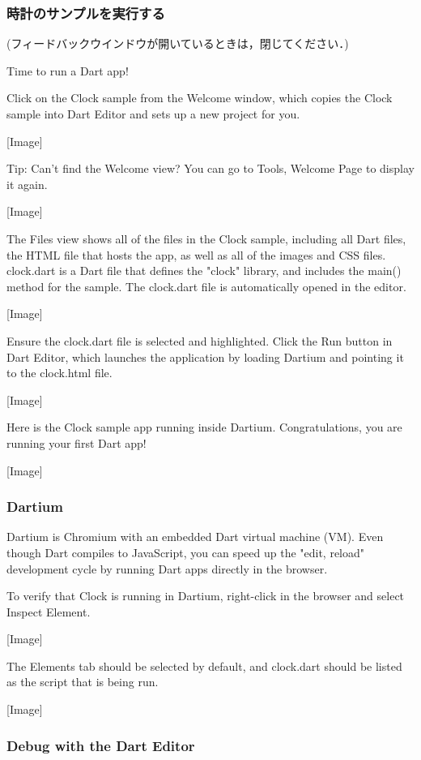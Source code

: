 \subsubsection{時計のサンプルを実行する}

(フィードバックウインドウが開いているときは，閉じてください．)

Time to run a Dart app!

Click on the Clock sample from the Welcome window, which copies the Clock sample into Dart Editor and sets up a new project for you.

[Image]

Tip: Can’t find the Welcome view? You can go to Tools, Welcome Page to display it again.

[Image]

The Files view shows all of the files in the Clock sample, including all Dart files, the HTML file that hosts the app, as well as all of the images and CSS files. clock.dart is a Dart file that defines the "clock" library, and includes the main() method for the sample. The clock.dart file is automatically opened in the editor.

[Image]

Ensure the clock.dart file is selected and highlighted. Click the Run button in Dart Editor, which launches the application by loading Dartium and pointing it to the clock.html file.

[Image]

Here is the Clock sample app running inside Dartium. Congratulations, you are running your first Dart app!

[Image]

\subsubsection{Dartium}

Dartium is Chromium with an embedded Dart virtual machine (VM). Even though Dart compiles to JavaScript, you can speed up the "edit, reload" development cycle by running Dart apps directly in the browser.

To verify that Clock is running in Dartium, right-click in the browser and select Inspect Element.

[Image]

The Elements tab should be selected by default, and clock.dart should be listed as the script that is being run.

[Image]

\subsubsection{Debug with the Dart Editor}

